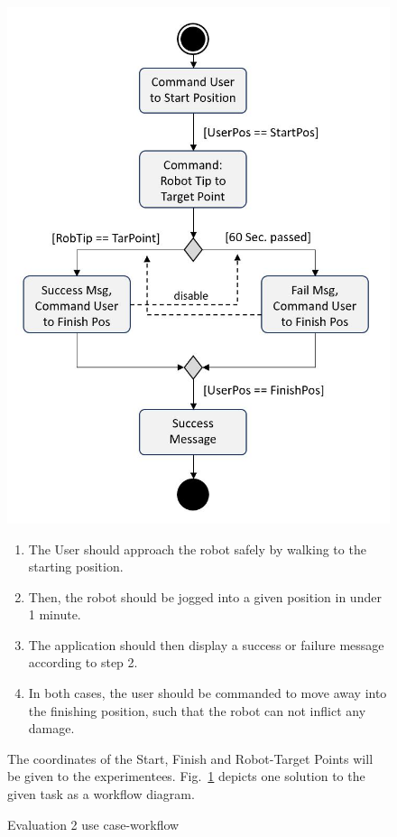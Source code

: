 \begin{figure}[!h]
	\begin{minipage}{0.4\textwidth}
		\centering
		\includegraphics[width=1\linewidth]{Figures/Evaluation2_workflow}
		\caption[Evaluation 2 use case-workflow]{Evaluation 2 use case-workflow}
		\label{Fig:Evaluation2Workflow}
	\end{minipage}\hfill
	\begin{minipage}{0.55\textwidth}
		\begin{enumerate}
			\item The User should approach the robot safely by walking to the starting position.
			\item Then, the robot should be jogged into a given position in under 1 minute.
			\item The application should then display a success or failure message according to step 2.
			\item In both cases, the user should be commanded to move away into the finishing position, such that the robot can not inflict any damage.
		\end{enumerate} 
		The coordinates of the Start, Finish and Robot-Target Points will be given to the experimentees. Fig.~\ref{Fig:Evaluation2Workflow} depicts one solution to the given task as a workflow diagram. 
	\end{minipage}
\end{figure}


